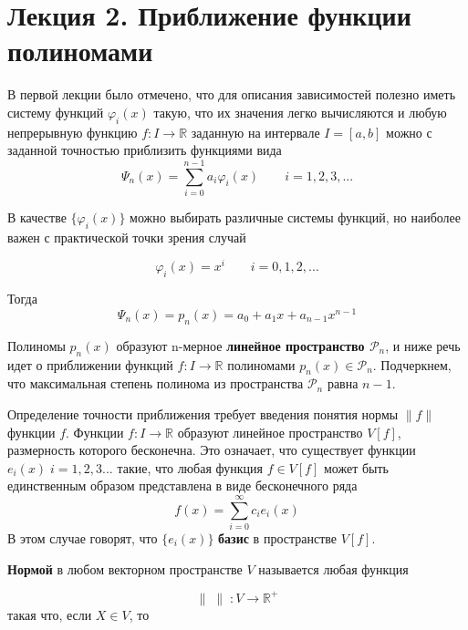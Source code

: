 \section{Лекция 2. Приближение функции полиномами}
В первой лекции было отмечено, что для описания зависимостей полезно иметь систему функций $\varphi _i(x)$ такую, что их значения легко вычисляются и любую непрерывную функцию $f: I \rightarrow \mathbb{R} $ заданную на интервале $ I = [a,b] $ можно с заданной точностью приблизить функциями вида 
\begin{equation}
\varPsi_n(x)=\sum_{i=0}^{n-1}{a_i\varphi_i(x)} \qquad i = 1, 2, 3, ...
\end{equation}

В качестве $\{\varphi_i(x)\}$ можно выбирать различные системы функций, но наиболее важен с практической точки зрения случай 


\begin{equation}
\varphi _i(x) = x^i \qquad i = 0, 1, 2, ...
\end{equation}

Тогда
\begin{equation}\label{eq:polynom}
\varPsi _n(x) = p_n(x) = a_0 + a_1x + a_{n-1}x^{n-1} 
\end{equation}


Полиномы $p_n(x)$ образуют n-мерное \textbf{линейное пространство $\mathscr{P}_n$}, и ниже речь идет о приближении функций  $f:I \rightarrow \mathbb{R} $ полиномами $p_n(x) \in \mathscr{P}_n $. Подчеркнем, что максимальная степень полинома из пространства  $\mathscr{P}_n$ равна $n - 1$.


Определение точности приближения требует введения понятия нормы $\parallel f \parallel$ функции $f$. 
Функции $f: I \rightarrow \mathbb{R} $ образуют линейное пространство $V[f]$, размерность которого бесконечна. Это означает, что существует функции $e_i(x) \; i = 1, 2, 3 ...$ такие, что любая функция $f \in V[f]$ может быть единственным образом представлена в виде бесконечного ряда 
\begin{equation}
f(x) = \sum_{i=0}^{\infty} {c_i e_i(x)}
\end{equation}
В этом случае говорят, что $\{e_i(x)\}$ \textbf{базис} в пространстве $V[f]$.

\textbf{Нормой} в любом векторном пространстве $V$ называется любая функция 
 
\begin{equation}
\parallel \; \parallel \; : V \rightarrow \mathbb{R}^+
\end{equation}
такая что, если $X\in V$, то

